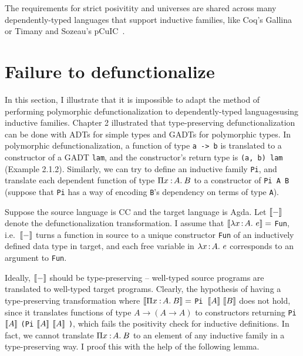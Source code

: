 The requirements for strict posivitity and universes are shared across many dependently-typed languages that support inductive families, like Coq's Gallina~\cite{?} or Timany and Sozeau's pCuIC~\cite{?}. 

\section{Failure to defunctionalize}
\label{sec:3.2}

In this section, I illustrate that it is impossible to adapt the method of performing polymorphic defunctionalization to dependently-typed languagesusing inductive families. Chapter 2 illustrated that type-preserving defunctionalization can be done with ADTs for simple types and GADTs for polymorphic types. In polymorphic defunctionalization, a function of type \texttt{a -> b} is translated to a constructor of a GADT \texttt{lam}, and the constructor's return type is \texttt{(a, b) lam} (Example 2.1.2). Similarly, we can try to define an inductive family \texttt{Pi}, and translate each dependent function of type $\Pi x\mkern1.5mu{\hspace{0.5mm}{:}\hspace{0.5mm}} A.\hspace{0.8mm}B$ to a constructor of \texttt{Pi A B} (suppose that \texttt{Pi} has a way of encoding \texttt{B}'s dependency on terms of type \texttt{A}). 

Suppose the source language is CC and the target language is Agda. Let ${[\![ - ]\!]}$ denote the defunctionalization transformation. I assume that ${[\![ \lambda x\hspace{0.5mm}{:}\hspace{0.5mm} A.\ e ]\!]} =$ \texttt{Fun}, i.e.~${[\![ - ]\!]}$ turns a function in source to a unique constructor \texttt{Fun} of an inductively defined data type in target, and each free variable in $\lambda x\hspace{0.5mm}{:}\hspace{0.5mm} A.\ e$ corresponds to an argument to \texttt{Fun}. 

Ideally, ${[\![ - ]\!]}$ should be type-preserving -- well-typed source programs are translated to well-typed target programs. Clearly, the hypothesis of having a type-preserving transformation where ${[\![ \Pi x\mkern1.5mu{\hspace{0.5mm}{:}\hspace{0.5mm}} A.\hspace{0.8mm}B ]\!]} =$ \texttt{Pi }$\bbracket{A}\ \bbracket{B}$ does not hold, since it translates functions of type $A \rightarrow (A \rightarrow A)$ to constructors returning \texttt{Pi} ${[\![ A ]\!]}$ \texttt{(Pi} ${[\![ A ]\!]}$ ${[\![ A ]\!]}$ \texttt{)}, which fails the positivity check for inductive definitions. In fact, we cannot translate $\Pi x\mkern1.5mu{\hspace{0.5mm}{:}\hspace{0.5mm}} A.\hspace{0.8mm}B$ to an element of any inductive family in a type-preserving way. I proof this with the help of the following lemma.

